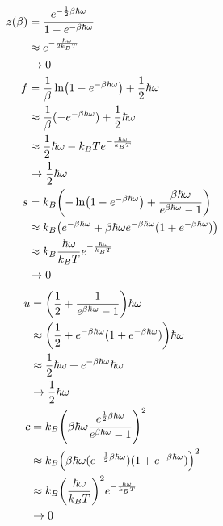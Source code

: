 \documentclass[uplatex,dvipdfmx,a4paper,11pt]{jlreq}
\theoremstyle{definition}
\begin{document}
\begin{align}
  z(\beta) & = \frac{e^{-\frac{1}{2}\beta\hbar\omega}}{1 - e^{-\beta\hbar\omega}}                                       \\
           & \approx e^{-\frac{\hbar\omega}{2k_BT}}                                                                     \\
           & \to 0                                                                                                      \\
  f        & = \frac{1}{\beta}\ln(1 - e^{-\beta\hbar\omega}) + \frac{1}{2}\hbar\omega                                   \\
           & \approx \frac{1}{\beta}(-e^{-\beta\hbar\omega}) + \frac{1}{2}\hbar\omega                                   \\
           & \approx \frac{1}{2}\hbar\omega - k_BTe^{-\frac{\hbar\omega}{k_BT}}                                         \\
           & \to \frac{1}{2}\hbar\omega                                                                                 \\
  s        & = k_B\qty(-\ln(1 - e^{-\beta\hbar\omega}) + \frac{\beta\hbar\omega}{e^{\beta\hbar\omega} - 1})             \\
           & \approx k_B\qty(e^{-\beta\hbar\omega} + \beta\hbar\omega e^{-\beta\hbar\omega}(1 + e^{-\beta\hbar\omega})) \\
           & \approx k_B\frac{\hbar\omega}{k_BT}e^{- \frac{\hbar\omega}{k_BT}}                                          \\
           & \to 0                                                                                                      \\
\end{align}
\begin{align}
  u & = \qty(\frac{1}{2} + \frac{1}{e^{\beta\hbar\omega} - 1})\hbar\omega                              \\
    & \approx \qty(\frac{1}{2} + e^{-\beta\hbar\omega}(1 + e^{-\beta\hbar\omega}))\hbar\omega          \\
    & \approx \frac{1}{2}\hbar\omega + e^{-\beta\hbar\omega}\hbar\omega                                \\
    & \to \frac{1}{2}\hbar\omega                                                                       \\
  c & = k_B\qty(\beta\hbar\omega\frac{e^{\frac{1}{2}\beta\hbar\omega}}{e^{\beta\hbar\omega} - 1})^2    \\
    & \approx k_B\qty(\beta\hbar\omega(e^{-\frac{1}{2}\beta\hbar\omega})(1 + e^{-\beta\hbar\omega}))^2 \\
    & \approx k_B\qty(\frac{\hbar\omega}{k_BT})^2e^{-\frac{\hbar\omega}{k_BT}}                         \\
    & \to 0
\end{align}
\end{document}
